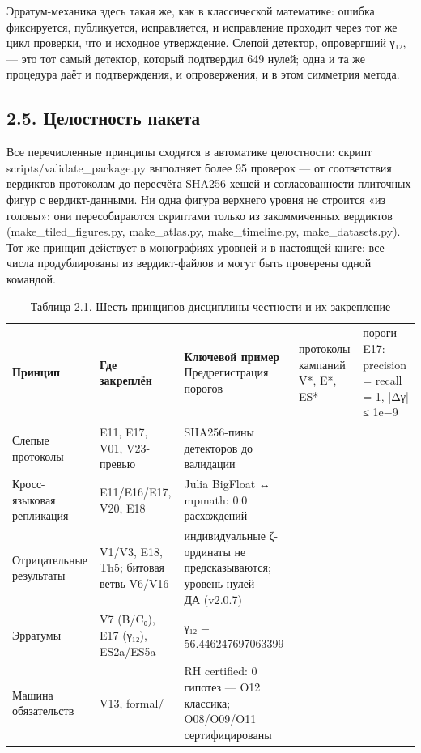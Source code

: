 \documentclass[11pt,a4paper]{article}
\begin{document}
Эрратум-механика здесь такая же, как в классической математике: ошибка фиксируется, публикуется, исправляется, и исправление проходит через тот же цикл проверки, что и исходное утверждение. Слепой детектор, опровергший γ₁₂, — это тот самый детектор, который подтвердил 649 нулей; одна и та же процедура даёт и подтверждения, и опровержения, и в этом симметрия метода.

\subsection{2.5. Целостность пакета}

Все перечисленные принципы сходятся в автоматике целостности: скрипт scripts/validate\_package.py выполняет более 95 проверок — от соответствия вердиктов протоколам до пересчёта SHA256-хешей и согласованности плиточных фигур с вердикт-данными. Ни одна фигура верхнего уровня не строится «из головы»: они пересобираются скриптами только из закоммиченных вердиктов (make\_tiled\_figures.py, make\_atlas.py, make\_timeline.py, make\_datasets.py). Тот же принцип действует в монографиях уровней и в настоящей книге: все числа продублированы из вердикт-файлов и могут быть проверены одной командой.

\begin{table}[htbp]\centering\small
\caption{Таблица 2.1. Шесть принципов дисциплины честности и их закрепление}
\begin{tabular}{p{} p{} p{}}
\toprule
\textbf{Принцип} & \textbf{Где закреплён} & \textbf{Ключевой пример}
\midrule
Предрегистрация порогов & протоколы кампаний V*, E*, ES* & пороги E17: precision = recall = 1, |Δγ| ≤ 1e−9 \\
Слепые протоколы & E11, E17, V01, V23-превью & SHA256-пины детекторов до валидации \\
Кросс-языковая репликация & E11/E16/E17, V20, E18 & Julia BigFloat ↔ mpmath: 0.0 расхождений \\
Отрицательные результаты & V1/V3, E18, Th5; битовая ветвь V6/V16 & индивидуальные ζ-ординаты не предсказываются; уровень нулей — ДА (v2.0.7) \\
Эрратумы & V7 (B/C₀), E17 (γ₁₂), ES2a/ES5a & γ₁₂ = 56.446247697063399 \\
Машина обязательств & V13, formal/ & RH certified: 0 гипотез — O12 классика; O08/O09/O11 сертифицированы \\
\bottomrule
\end{tabular}
\end{table}
\end{document}
